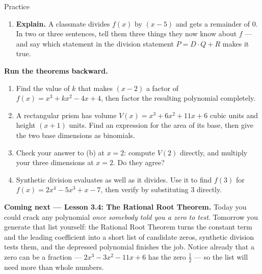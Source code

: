\documentclass[10pt]{article}
\begin{document}
\begin{notesbox}{Practice}
\begin{enumerate}[leftmargin=1.9em, itemsep=11pt]
  \item \textbf{Explain.} A classmate divides $f(x)$ by $(x - 5)$ and gets a remainder of $0$. In two
        or three sentences, tell them three things they now know about $f$ --- and say which
        statement in the division statement $P = D\cdot Q + R$ makes it true. 
\end{enumerate}
\end{notesbox}

\begin{extensionbox}
\textbf{Run the theorems backward.}
\begin{enumerate}[label=(\alph*), leftmargin=1.8em, itemsep=5pt]
  \item Find the value of $k$ that makes $(x - 2)$ a factor of $f(x) = x^3 + kx^2 - 4x + 4$, then
        factor the resulting polynomial completely.
  \item A rectangular prism has volume $V(x) = x^3 + 6x^2 + 11x + 6$ cubic units and height
        $(x + 1)$ units. Find an expression for the area of its base, then give the two base
        dimensions as binomials.
  \item Check your answer to (b) at $x = 2$: compute $V(2)$ directly, and multiply your three
        dimensions at $x=2$. Do they agree?
  \item Synthetic division evaluates as well as it divides. Use it to find $f(3)$ for
        $f(x) = 2x^4 - 5x^3 + x - 7$, then verify by substituting $3$ directly.
\end{enumerate}
\end{extensionbox}

\begin{spiralbox}
\textbf{Coming next --- Lesson 3.4: The Rational Root Theorem.} Today you could crack any polynomial
\emph{once somebody told you a zero to test}. Tomorrow you generate that list yourself: the Rational
Root Theorem turns the constant term and the leading coefficient into a short list of candidate
zeros, synthetic division tests them, and the depressed polynomial finishes the job. Notice already
that a zero can be a fraction --- $2x^3-3x^2-11x+6$ has the zero $\tfrac12$ --- so the list will need
more than whole numbers.
\end{spiralbox}
\end{document}
